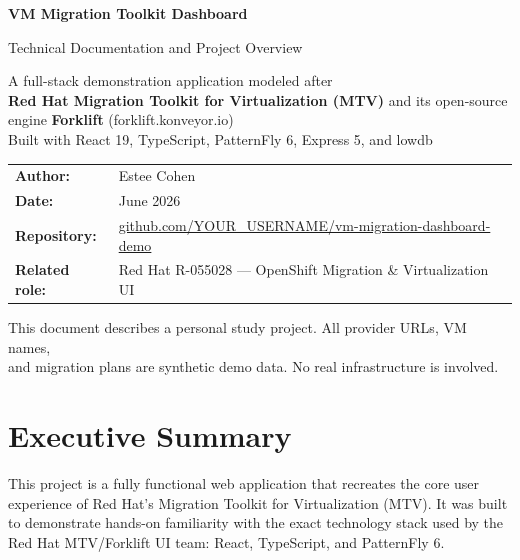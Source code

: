 \documentclass[12pt,a4paper]{article}
\begin{document}
\begin{titlepage}
  \centering
  \vspace*{3cm}
  {\huge\bfseries VM Migration Toolkit Dashboard\par}
  \vspace{0.6cm}
  {\large\color{darkgray} Technical Documentation and Project Overview\par}
  \vspace{2cm}
  \begin{mdframed}[linecolor=codeframe, backgroundcolor=codebg, innertopmargin=14pt, innerbottommargin=14pt]
    \centering
    A full-stack demonstration application modeled after\\
    \textbf{Red Hat Migration Toolkit for Virtualization (MTV)} and its open-source\\
    engine \textbf{Forklift} ({\ttfamily forklift.konveyor.io})\\[0.4em]
    \small Built with React 19, TypeScript, PatternFly 6, Express 5, and lowdb
  \end{mdframed}
  \vspace{2cm}
  \begin{tabular}{ll}
    \textbf{Author:}       & Estee Cohen \\[4pt]
    \textbf{Date:}         & June 2026 \\[4pt]
    \textbf{Repository:}   & \href{https://github.com/YOUR\_USERNAME/vm-migration-dashboard-demo}{github.com/YOUR\_USERNAME/vm-migration-dashboard-demo} \\[4pt]
    \textbf{Related role:} & Red Hat R-055028 — OpenShift Migration \& Virtualization UI \\
  \end{tabular}
  \vfill
  {\small\color{darkgray}
    This document describes a personal study project. All provider URLs, VM names,\\
    and migration plans are synthetic demo data. No real infrastructure is involved.}
\end{titlepage}

\tableofcontents
\newpage

\section{Executive Summary}

This project is a fully functional web application that recreates the core user experience of Red Hat's Migration Toolkit for Virtualization (MTV). It was built to demonstrate hands-on familiarity with the exact technology stack used by the Red Hat MTV/Forklift UI team: React, TypeScript, and PatternFly 6.
\end{document}
